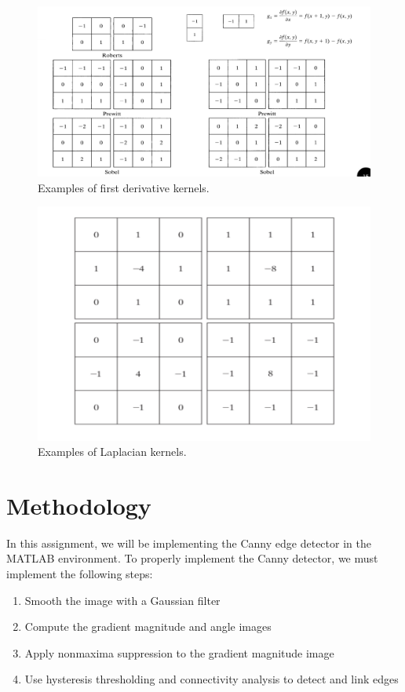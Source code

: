 \documentclass[9pt]{IEEEtran}
\begin{document}
 \begin{figure}[!htb]
\centering
\includegraphics[width=1\columnwidth]{first_derivative_kernels.png}
\caption[c1]{ Examples of first derivative kernels. }
\label{fig_10}
\end{figure}
 
\begin{figure}[!htb]
\centering
\includegraphics[width=1\columnwidth]{laplacian_kernels.png}
\caption[c1]{ Examples of Laplacian kernels. }
\label{fig_11}
\end{figure}

\section{Methodology}

In this assignment, we will be implementing the Canny edge detector in the MATLAB environment. To properly implement the Canny detector, we must implement the following steps:

\begin{enumerate}
\item Smooth the image with a Gaussian filter
\item Compute the gradient magnitude and angle images
\item Apply nonmaxima suppression to the gradient magnitude image
\item Use hysteresis thresholding and connectivity analysis to detect and link edges
\end{enumerate}
\end{document}
